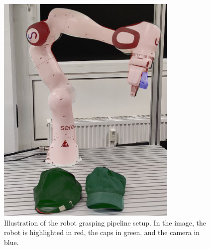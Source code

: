 \begin{figure}[htb]
    \centering
    \includegraphics[scale=0.35]{images/franka.png}
    \caption{Illustration of the robot grasping pipeline setup. In the image, the robot is highlighted in red, the caps in green, and the camera in blue.}
    \label{fig:robot_setup}
\end{figure}